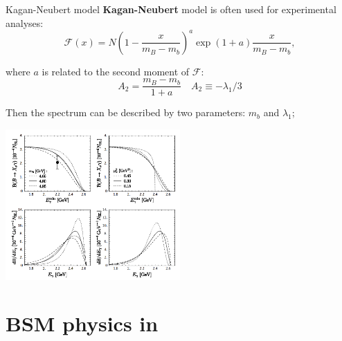 \documentclass[xcolor=dvipsnames]{beamer}
\begin{document}
   \begin{frame}{Kagan-Neubert model}
      \scriptsize
      \textbf{Kagan-Neubert} model is often used for experimental analyses:
      \begin{equation}\nonumber
         \mathcal{F}(x) = N\left(1-\frac{x}{m_B-m_b}\right)^a\exp{(1+a)\frac{x}{m_B-m_b}},
     \end{equation}

     where $a$ is related to the second moment of $\mathcal{F}$:
     \begin{equation*}
      A_2 = \frac{m_B-m_b}{1+a} \quad A_2 \equiv -\lambda_1/3
     \end{equation*}


     Then the spectrum can be described by two parameters: $m_b$ and $\lambda_1$;

     \begin{center}

     \includegraphics[width=0.5\textwidth]{figures/kagan_neubert.png}
   \end{center}
   \end{frame}

   \section{BSM physics in \safeBtoXsgamma}
\end{document}
